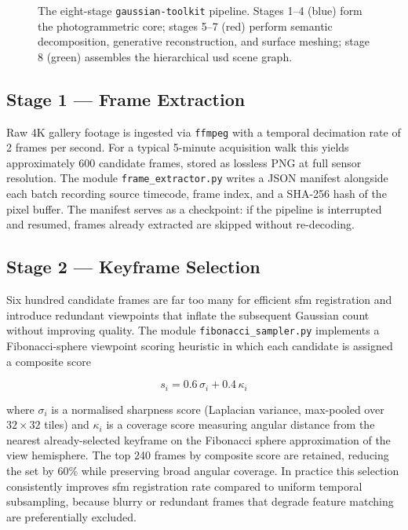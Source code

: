 \begin{figure}[htbp]
\caption{The eight-stage \texttt{gaussian-toolkit} pipeline. Stages 1–4 (blue) form the
  photogrammetric core; stages 5–7 (red) perform semantic decomposition, generative
  reconstruction, and surface meshing; stage 8 (green) assembles the hierarchical
  \acrshort{usd} scene graph.}
\label{fig:pipeline-flow}
\end{figure}

\subsection{Stage 1 — Frame Extraction}

Raw 4K gallery footage is ingested via \texttt{ffmpeg} with a temporal decimation rate
of 2 frames per second. For a typical 5-minute acquisition walk this yields approximately
600 candidate frames, stored as lossless PNG at full sensor resolution. The module
\texttt{frame\_extractor.py} writes a JSON manifest alongside each batch recording
source timecode, frame index, and a SHA-256 hash of the pixel buffer. The manifest
serves as a checkpoint: if the pipeline is interrupted and resumed, frames already
extracted are skipped without re-decoding.

\subsection{Stage 2 — Keyframe Selection}

Six hundred candidate frames are far too many for efficient \acrshort{sfm} registration
and introduce redundant viewpoints that inflate the subsequent Gaussian count without
improving quality. The module \texttt{fibonacci\_sampler.py} implements a Fibonacci-sphere
viewpoint scoring heuristic in which each candidate is assigned a composite score

\[
  s_i = 0.6\,\sigma_i + 0.4\,\kappa_i
\]

\noindent where $\sigma_i$ is a normalised sharpness score (Laplacian variance, max-pooled
over $32\times32$ tiles) and $\kappa_i$ is a coverage score measuring angular distance from
the nearest already-selected keyframe on the Fibonacci sphere approximation of the view
hemisphere. The top 240 frames by composite score are retained, reducing the set by 60\%
while preserving broad angular coverage. In practice this selection consistently improves
\acrshort{sfm} registration rate compared to uniform temporal subsampling, because blurry
or redundant frames that degrade feature matching are preferentially excluded.

